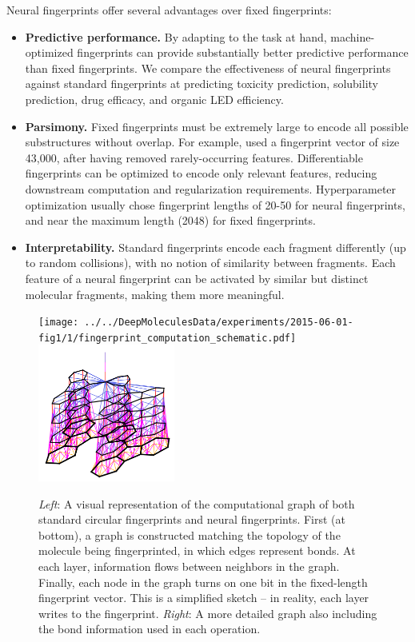 \documentclass{article}
\begin{document}
Neural fingerprints offer several advantages over fixed fingerprints:
\begin{itemize}
\item {\bf Predictive performance.}
By adapting to the task at hand, machine-optimized fingerprints can provide substantially better predictive performance than fixed fingerprints.
We compare the effectiveness of neural fingerprints against standard fingerprints at predicting toxicity prediction, solubility prediction, drug efficacy, and organic LED efficiency.
\item {\bf Parsimony.}
Fixed fingerprints must be extremely large to encode all possible substructures without overlap.
For example, \cite{unterthinerdeep} used a fingerprint vector of size 43,000, after having removed rarely-occurring features.
Differentiable fingerprints can be optimized to encode only relevant features, reducing downstream computation and regularization requirements.
Hyperparameter optimization usually chose fingerprint lengths of 20-50 for neural fingerprints, and near the maximum length (2048) for fixed fingerprints.
\item {\bf Interpretability.}
Standard fingerprints encode each fragment differently (up to random collisions), with no notion of similarity between fragments.
Each feature of a neural fingerprint can be activated by similar but distinct molecular fragments, making them more meaningful.
\end{itemize}

\begin{figure}
\centerline{\texttt{[image: ../../DeepMoleculesData/experiments/2015-06-01-fig1/1/fingerprint\_computation\_schematic.pdf]}
\hspace{2em}
\includegraphics[width=0.4\textwidth, clip, trim=4mm 4mm 4mm 8mm]{figures/3d-nets/net1}}
\caption{\emph{Left}: A visual representation of the computational graph of both standard circular fingerprints and neural fingerprints.
First (at bottom), a graph is constructed matching the topology of the molecule being fingerprinted, in which edges represent bonds.
At each layer, information flows between neighbors in the graph.
Finally, each node in the graph turns on one bit in the fixed-length fingerprint vector.
This is a simplified sketch -- in reality, each layer writes to the fingerprint.
\emph{Right}: A more detailed graph also including the bond information used in each operation.}
\label{fig:architecture sketch}
\end{figure}
\end{document}
